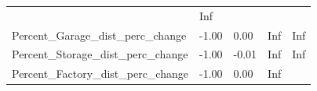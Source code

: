 \documentclass[]{article}
\begin{document}
\begin{longtable}[]{@{}lllll@{}}
\begin{minipage}[t]{0.09\columnwidth}
\end{minipage} & \begin{minipage}[t]{0.11\columnwidth}\raggedright\strut
Inf\strut
\end{minipage}\tabularnewline
\begin{minipage}[t]{0.49\columnwidth}\raggedright\strut
Percent\_Garage\_dist\_perc\_change\strut
\end{minipage} & \begin{minipage}[t]{0.08\columnwidth}\raggedright\strut
-1.00\strut
\end{minipage} & \begin{minipage}[t]{0.09\columnwidth}\raggedright\strut
0.00\strut
\end{minipage} & \begin{minipage}[t]{0.09\columnwidth}\raggedright\strut
Inf\strut
\end{minipage} & \begin{minipage}[t]{0.11\columnwidth}\raggedright\strut
Inf\strut
\end{minipage}\tabularnewline
\begin{minipage}[t]{0.49\columnwidth}\raggedright\strut
Percent\_Storage\_dist\_perc\_change\strut
\end{minipage} & \begin{minipage}[t]{0.08\columnwidth}\raggedright\strut
-1.00\strut
\end{minipage} & \begin{minipage}[t]{0.09\columnwidth}\raggedright\strut
-0.01\strut
\end{minipage} & \begin{minipage}[t]{0.09\columnwidth}\raggedright\strut
Inf\strut
\end{minipage} & \begin{minipage}[t]{0.11\columnwidth}\raggedright\strut
Inf\strut
\end{minipage}\tabularnewline
\begin{minipage}[t]{0.49\columnwidth}\raggedright\strut
Percent\_Factory\_dist\_perc\_change\strut
\end{minipage} & \begin{minipage}[t]{0.08\columnwidth}\raggedright\strut
-1.00\strut
\end{minipage} & \begin{minipage}[t]{0.09\columnwidth}\raggedright\strut
0.00\strut
\end{minipage} & \begin{minipage}[t]{0.09\columnwidth}\raggedright\strut
Inf\strut
\end{minipage} & \begin{minipage}[t]{0.11\columnwidth}\raggedright\strut

\end{minipage}
\end{longtable}
\end{document}
